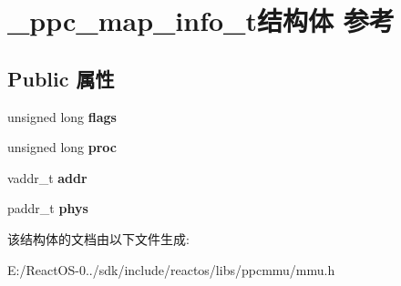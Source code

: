 \hypertarget{struct__ppc__map__info__t}{}\section{\+\_\+ppc\+\_\+map\+\_\+info\+\_\+t结构体 参考}
\label{struct__ppc__map__info__t}
\subsection*{Public 属性}
\begin{DoxyCompactItemize}
\item 
\mbox{\label{struct__ppc__map__info__t_a9fc3a5c56c9f5bc9b2922d24ca398a7d}} 
unsigned long {\bfseries flags}
\item 
\mbox{\label{struct__ppc__map__info__t_a65f6819ad857175b01cf140fe920a4d5}} 
unsigned long {\bfseries proc}
\item 
\mbox{\label{struct__ppc__map__info__t_aac1082f266c5a67636d1437a111938e4}} 
vaddr\+\_\+t {\bfseries addr}
\item 
\mbox{\label{struct__ppc__map__info__t_a510664937130883301d63c0a01f117ae}} 
paddr\+\_\+t {\bfseries phys}
\end{DoxyCompactItemize}


该结构体的文档由以下文件生成\+:\begin{DoxyCompactItemize}
\item 
E\+:/\+React\+O\+S-\/0../sdk/include/reactos/libs/ppcmmu/mmu.\+h\end{DoxyCompactItemize}
